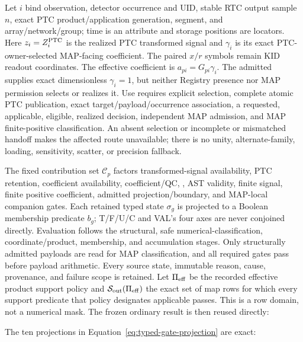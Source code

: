 \documentclass[10pt]{article}
\begin{document}
Let \(i\) bind observation, detector occurrence and UID, stable RTC output
sample \(n\), exact PTC product/application generation, segment, and
array/network/group; time is an attribute and storage positions are locators.
Here \(z_i=Z_i^{\rm PTC}\) is the realized PTC transformed signal and
\(\gamma_i\) is its exact PTC-owner-selected MAP-facing coefficient. The
paired \(x/r\) symbols remain KID readout coordinates. The effective
coefficient is \(a_{pi}=G_{pi}\gamma_i\). The admitted
\SCIMapPTCUniformFamily{} supplies exact dimensionless \(\gamma_i=1\), but
neither Registry presence nor MAP permission selects or realizes it. Use
requires explicit selection, complete atomic PTC publication, exact
target/payload/occurrence association, a requested, applicable, eligible,
realized \SCIMapPTCUniformHandoffProfile{} decision, independent MAP admission,
and MAP finite-positive classification. An absent selection or incomplete or
mismatched handoff makes the affected route unavailable; there is no unity,
alternate-family, loading, sensitivity, scatter, or precision fallback.

The fixed contribution set \(\mathcal C_p\) factors transformed-signal
availability, PTC retention, coefficient availability, coefficient/QC,
\SCIMapUpstreamProfile, AST validity, finite signal, finite
positive coefficient, admitted projection/boundary, and MAP-local companion
gates. Each retained typed state \(\sigma_g\) is projected to a Boolean
membership predicate \(b_g\); T/F/U/C and VAL's four axes are never conjoined
directly. Evaluation follows the structural, safe numerical-classification,
coordinate/product, membership, and accumulation stages. Only structurally
admitted payloads are read for MAP classification, and all required gates
pass before payload arithmetic. Every source state, immutable reason, cause,
provenance, and failure scope is retained.
Let \(\Pi_{\rm eff}\) be the recorded effective product
support policy and \(\mathcal S_{\rm out}(\Pi_{\rm eff})\) the exact set of map
rows for which every support predicate that policy designates applicable
passes. This is a row domain, not a numerical mask. The frozen ordinary result
is then reused directly:

\SCIMapObservationEquations

The ten projections in Equation~\eqref{eq:typed-gate-projection} are exact:
\end{document}

